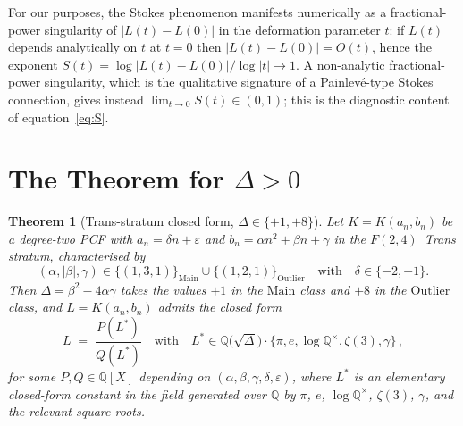 \documentclass[11pt,reqno]{amsart}
\newtheorem{theorem}{Theorem}[section]
\theoremstyle{definition}
\begin{document}
For our purposes, the Stokes phenomenon manifests numerically as
a fractional-power singularity of $|L(t)-L(0)|$ in the deformation
parameter $t$: if $L(t)$ depends analytically on $t$ at
$t=0$ then $|L(t)-L(0)|=O(t)$, hence the exponent
$S(t) = \log|L(t)-L(0)|/\log|t| \to 1$. A non-analytic
fractional-power singularity, which is the qualitative
signature of a Painlev\'e-type Stokes connection, gives instead
$\lim_{t\to 0} S(t) \in (0,1)$; this is the diagnostic content
of equation~\eqref{eq:S}.

\section{The Theorem for $\Delta>0$}\label{sec:thm}

\begin{theorem}[Trans-stratum closed form,
$\Delta\in\{+1,+8\}$]\label{thm:trans-closed}
Let $K = K(a_{n},b_{n})$ be a degree-two PCF with
$a_{n} = \delta n + \varepsilon$ and
$b_{n} = \alpha n^{2} + \beta n + \gamma$ in the
$F(2,4)$~Trans stratum, characterised by
\begin{equation}\label{eq:f24-trans}
(\alpha, |\beta|, \gamma) \in
\{(1, 3, 1)\}_{\mathrm{Main}}
\cup
\{(1, 2, 1)\}_{\mathrm{Outlier}}
\quad\text{with}\quad
\delta\in\{-2,+1\}.
\end{equation}
Then $\Delta = \beta^{2} - 4\alpha\gamma$ takes the values
$+1$ in the $\mathrm{Main}$ class and $+8$ in the
$\mathrm{Outlier}$ class, and $L = K(a_{n},b_{n})$ admits
the closed form
\begin{equation}\label{eq:trans-cf}
L
\;=\;
\frac{P(L^{*})}{Q(L^{*})}
\quad\text{with}\quad
L^{*}\in\mathbb{Q}\big(\sqrt{\Delta}\big)\cdot\{\pi, e, \log
\mathbb{Q}^{\times}, \zeta(3), \gamma\}\,,
\end{equation}
for some $P, Q\in\mathbb{Q}[X]$ depending on
$(\alpha,\beta,\gamma,\delta,\varepsilon)$, where $L^{*}$ is an
elementary closed-form constant in the field generated over
$\mathbb{Q}$ by $\pi$, $e$, $\log\mathbb{Q}^{\times}$,
$\zeta(3)$, $\gamma$, and the relevant square roots.
\end{theorem}
\end{document}
